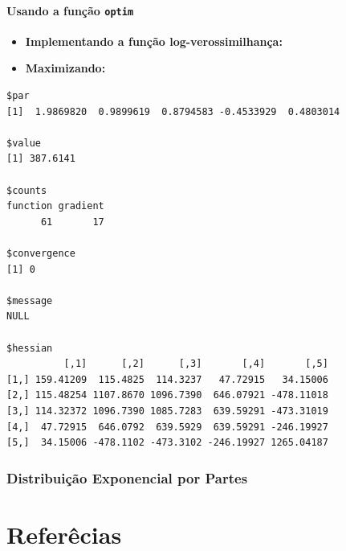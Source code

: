\documentclass[
  12pt,
  letterpaper,
  DIV=11,
  numbers=noendperiod]{scrreprt}
\providecommand{\tightlist}{%
  \setlength{\itemsep}{0pt}\setlength{\parskip}{0pt}}\usepackage{longtable,booktabs,array}
\begin{document}
\subsubsection{\texorpdfstring{Usando a função
\texttt{optim}}{Usando a função optim}}\label{usando-a-funuxe7uxe3o-optim-1}

\begin{itemize}
\tightlist
\item
  \textbf{Implementando a função log-verossimilhança:}
\end{itemize}

\begin{itemize}
\tightlist
\item
  \textbf{Maximizando:}
\end{itemize}

\begin{verbatim}
$par
[1]  1.9869820  0.9899619  0.8794583 -0.4533929  0.4803014

$value
[1] 387.6141

$counts
function gradient 
      61       17 

$convergence
[1] 0

$message
NULL

$hessian
          [,1]      [,2]      [,3]       [,4]       [,5]
[1,] 159.41209  115.4825  114.3237   47.72915   34.15006
[2,] 115.48254 1107.8670 1096.7390  646.07921 -478.11018
[3,] 114.32372 1096.7390 1085.7283  639.59291 -473.31019
[4,]  47.72915  646.0792  639.5929  639.59291 -246.19927
[5,]  34.15006 -478.1102 -473.3102 -246.19927 1265.04187
\end{verbatim}

\subsection{Distribuição Exponencial por
Partes}\label{distribuiuxe7uxe3o-exponencial-por-partes-1}


\chapter*{Referêcias}\label{referuxeacias}

\end{document}
